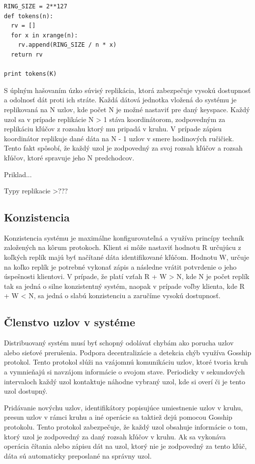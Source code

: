 \documentclass[11pt,twoside,a4paper]{book}
\begin{document}
\begin{verbatim}
RING_SIZE = 2**127
def tokens(n):
  rv = []
  for x in xrange(n):
    rv.append(RING_SIZE / n * x)
  return rv

print tokens(K)
\end{verbatim}


S úplným hašovaním úzko súvisý replikácia, ktorá zabezpečuje vysokú dostupnosť a odolnosť dát proti ich stráte. Každá dátová jednotka vložená do systému je replikovaná na N uzlov, kde počet N je možné nastaviť pre daný keyspace. Každý uzol sa v prípade replikácie N > 1 stáva koordinátorom, zodpovedným za replikáciu kľúčov z rozsahu ktorý mu pripadá v kruhu. V prípade zápisu koordinátor replikuje dané dáta na N - 1 uzlov v smere hodinových ručičiek. Tento fakt spôsobí, že každý uzol je zodpovedný za svoj rozsah kľúčov a rozsah kľúčov, ktoré spravuje jeho N predchodcov.

Priklad...

Typy replikacie >???

\subsection{Konzistencia}

Konzistencia systému je maximálne konfigurovateľná a využíva princípy techník založených na kôrum protokoch. Klient si môže nastaviť hodnotu R určujúcu z koľkých replík majú byť načítané dáta identifikované kľúčom. Hodnotu W, určuje na koľko replík je potrebné vykonať zápis a následne vrátit potvrdenie o jeho úspešnosti klientovi. V prípade, že platí vzťah R + W > N, kde N je počet replík tak sa jedná o silne konzistentný systém, naopak v prípade voľby klienta, kde R + W < N, sa jedná o slabú konzistenciu a zaručíme vysokú dostupnosť.

\subsection{Členstvo uzlov v systéme}

Distribuovaný systém musí byť schopný odolávať chybám ako porucha uzlov alebo sieťové prerušenia. Podpora decentralizácie a detekcia chýb využíva Gosship protokol. Tento protokol slúži na vzájomnú komunikáciu uzlov, ktoré tvoria kruh a vymnieňajú si navzájom informácie o svojom stave. Periodicky v sekundových intervaloch každý uzol kontaktuje náhodne vybraný uzol, kde si overí či je tento uzol dostupný.

Pridávanie novýchu uzlov, identifikátory popisujúce umiestnenie uzlov v kruhu, presun uzlov v rámci kruhu a iné operácie sa taktiež dejú pomocou Gosship protokolu. Tento protokol zabezpečuje, že každý uzol obsahuje informácie o tom, ktorý uzol je zodpovedný za daný rozsah kľúčov v kruhu. Ak sa vykonáva operácia čítania alebo zápisu dát na uzol, ktorý nie je zodpovedný za tento kľúč, dáta sú automaticky preposlané na správny uzol.
\end{document}
